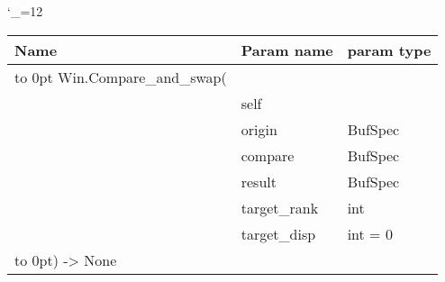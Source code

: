 \begingroup \catcode`\_=12 \tt
\begin{tabular}{lll}
\toprule
\textrm{Name}&\textrm{Param name}&\textrm{param type}\\
\midrule
\hbox to 0pt {Win.Compare_and_swap(\hss}\\
& self\\
& origin & BufSpec\\
& compare & BufSpec\\
& result & BufSpec\\
& target_rank & int\\
& target_disp & int = 0\\
\hbox to 0pt{) -> None\hss}\\
\bottomrule
\end{tabular}
\endgroup
